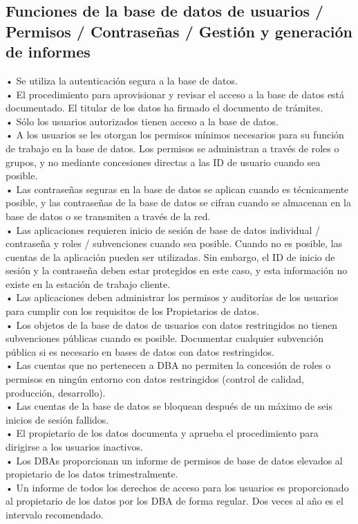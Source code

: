 \subsection{Funciones de la base de datos de usuarios / Permisos / Contraseñas / Gestión y generación de informes}
• Se utiliza la autenticación segura a la base de datos.\\      
• El procedimiento para aprovisionar y revisar el acceso a la base de datos está documentado. El titular de los datos ha firmado el documento de trámites.\\
• Sólo los usuarios autorizados tienen acceso a la base de datos.  \\         
• A los usuarios se les otorgan los permisos mínimos necesarios para su función de trabajo en la base de datos. Los permisos se administran a través de roles o grupos, y no mediante concesiones directas a las ID de usuario cuando sea posible.\\       
• Las contraseñas seguras en la base de datos se aplican cuando es técnicamente posible, y las contraseñas de la base de datos se cifran cuando se almacenan en la base de datos o se transmiten a través de la red.\\          
• Las aplicaciones requieren inicio de sesión de base de datos individual / contraseña y roles / subvenciones cuando sea posible. Cuando no es posible, las cuentas de la aplicación pueden ser utilizadas. Sin embargo, el ID de inicio de sesión y la contraseña deben estar protegidos en este caso, y esta información no existe en la estación de trabajo cliente.\\
• Las aplicaciones deben administrar los permisos y auditorías de los usuarios para cumplir con los requisitos de los Propietarios de datos.\\           
• Los objetos de la base de datos de usuarios con datos restringidos no tienen subvenciones públicas cuando es posible. Documentar cualquier subvención pública si es necesario en bases de datos con datos restringidos.\\           
• Las cuentas que no pertenecen a DBA no permiten la concesión de roles o permisos en ningún entorno con datos restringidos (control de calidad, producción, desarrollo).\\
• Las cuentas de la base de datos se bloquean después de un máximo de seis inicios de sesión fallidos.\\           
• El propietario de los datos documenta y aprueba el procedimiento para dirigirse a los usuarios inactivos.\\           
• Los DBAs proporcionan un informe de permisos de base de datos elevados al propietario de los datos trimestralmente.\\           
• Un informe de todos los derechos de acceso para los usuarios es proporcionado al propietario de los datos por los DBA de forma regular. Dos veces al año es el intervalo recomendado.

